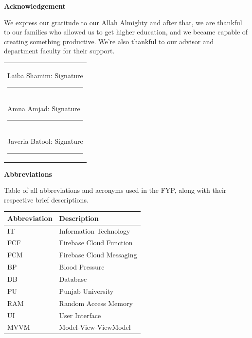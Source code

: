 \documentclass[12pt, a4paper, oneside]{report}
\begin{document}
\vfill

\newpage
\thispagestyle{empty}
\begin{center}
{\Large\bfseries Acknowledgement}
\end{center}
\vspace{1cm}

We express our gratitude to our Allah Almighty and after that, we are thankful to our families who allowed us to get higher education, and we became capable of creating something productive. We're also thankful to our advisor and department faculty for their support.

\vspace{2cm}

\begin{tabular}{@{}l@{}}
Laiba Shamim: Signature \rule{4cm}{0.4pt}\\[0.5cm]
Amna Amjad: Signature \rule{4cm}{0.4pt}\\[0.5cm]
Javeria Batool: Signature \rule{4cm}{0.4pt}\\
\end{tabular}

\vfill

\newpage
\thispagestyle{empty}
\begin{center}
{\Large\bfseries Abbreviations}
\end{center}
\vspace{0.5cm}

Table of all abbreviations and acronyms used in the FYP, along with their respective brief descriptions.

\vspace{0.5cm}

\begin{table}[H]
\centering
\begin{tabular}{|l|l|}
\hline
\textbf{Abbreviation} & \textbf{Description} \\ \hline
IT & Information Technology \\ \hline
FCF & Firebase Cloud Function \\ \hline
FCM & Firebase Cloud Messaging \\ \hline
BP & Blood Pressure \\ \hline
DB & Database \\ \hline
PU & Punjab University \\ \hline
RAM & Random Access Memory \\ \hline
UI & User Interface \\ \hline
MVVM & Model-View-ViewModel \\ \hline
\end{tabular}
\end{table}
\end{document}
